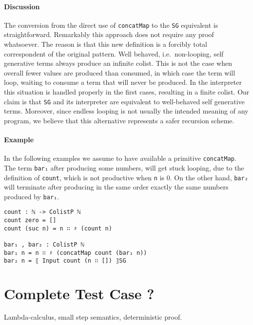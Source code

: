 \documentclass[10pt,a4paper]{article}
\begin{document}
\paragraph{Discussion}
The conversion from the direct use of \texttt{concatMap} to the \texttt{SG} equivalent is straightforward. Remarkably this approach does not require any proof whatsoever. The reason is that this new definition is a forcibly total 
correspondent of the original pattern. Well behaved, i.e.\ non-looping, self generative terms always produce an infinite colist. This is not the case when  overall fewer values are produced than consumed, in which case the term will loop, waiting to consume a term that will never be produced.
In the interpreter this situation is handled properly in the first cases, resulting in a finite colist. Our claim is that \texttt{SG} and its interpreter are equivalent to well-behaved self generative terms. Moreover, since endless looping is not usually the intended meaning of any program, we believe that this alternative represents a safer recursion scheme.

\paragraph{Example}
In the following examples we assume to have available a primitive \texttt{concatMap}. The term \texttt{bar₁} after producing some numbers, will get stuck looping, due to the definition of \texttt{count}, which is not productive when \texttt{n} is 0. On the other hand, \texttt{bar₂} will terminate after producing in the same order exactly the same numbers produced by \texttt{bar₁}.
\begin{verbatim}
count : ℕ -> ColistP ℕ
count zero = []
count (suc n) = n ∷ ♯ (count n)

bar₁ , bar₂ : ColistP ℕ
bar₁ n = n ∷ ♯ (concatMap count (bar₁ n))
bar₂ n = ⟦ Input count (n ∷ []) ⟧SG
\end{verbatim}

\section{Complete Test Case ?}
Lambda-calculus, small step semantics, deterministic proof.
\end{document}
